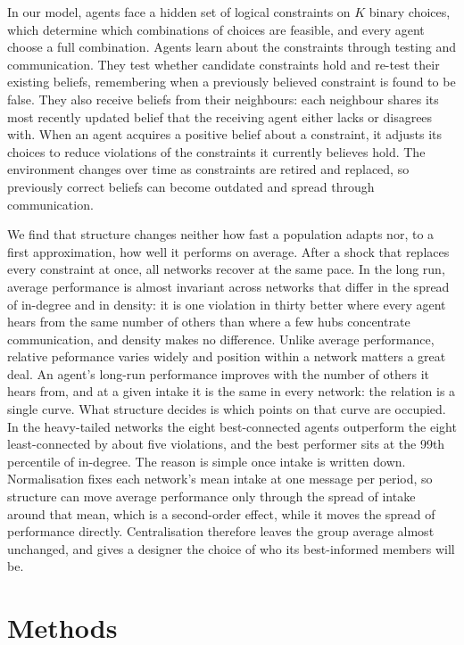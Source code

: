\documentclass[11pt]{article}
\begin{document}
In our model, agents face a hidden set of logical constraints on $K$ binary choices, which determine which combinations of choices are feasible, and every agent choose a full combination. Agents learn about the constraints through testing and communication. They test whether candidate constraints hold and re-test their existing beliefs, remembering when a previously believed constraint is found to be false. They also receive beliefs from their neighbours: each neighbour shares its most recently updated belief that the receiving agent either lacks or disagrees with. When an agent acquires a positive belief about a constraint, it adjusts its choices to reduce violations of the constraints it currently believes hold. The environment changes over time as constraints are retired and replaced, so previously correct beliefs can become outdated and spread through communication.

We find that structure changes neither how fast a population adapts nor, to a first approximation, how well it performs on average. After a shock that replaces every constraint at once, all networks recover at the same pace. In the long run, average performance is almost invariant across networks that differ in the spread of in-degree and in density: it is one violation in thirty better where every agent hears from the same number of others than where a few hubs concentrate communication, and density makes no difference. Unlike average performance, relative peformance varies widely and position within a network matters a great deal. An agent's long-run performance improves with the number of others it hears from, and at a given intake it is the same in every network: the relation is a single curve. What structure decides is which points on that curve are occupied. In the heavy-tailed networks the eight best-connected agents outperform the eight least-connected by about five violations, and the best performer sits at the 99th percentile of in-degree. The reason is simple once intake is written down. Normalisation fixes each network's mean intake at one message per period, so structure can move average performance only through the spread of intake around that mean, which is a second-order effect, while it moves the spread of performance directly. Centralisation therefore leaves the group average almost unchanged, and gives a designer the choice of who its best-informed members will be.


\section{Methods}\label{sec:methods}
\end{document}
